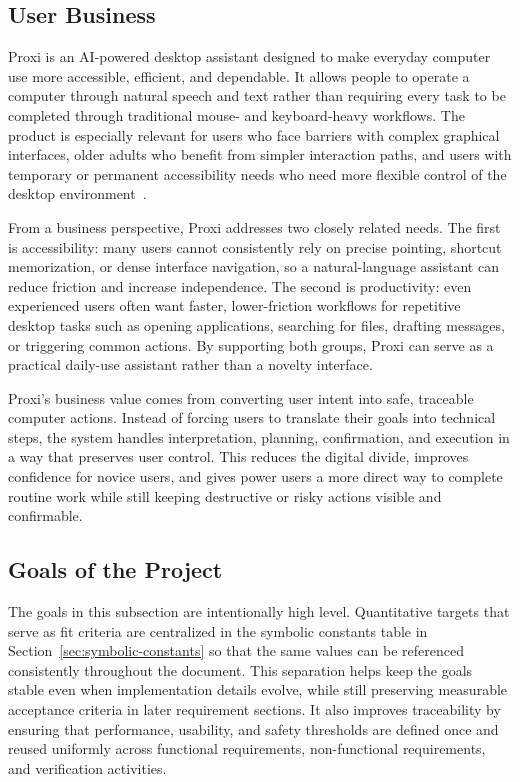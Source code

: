 \documentclass[12pt]{article}
\begin{document}
\subsection{User Business}
Proxi is an AI-powered desktop assistant designed to make everyday
computer use more accessible, efficient, and dependable. It allows
people to operate a computer through natural speech and text rather
than requiring every task to be completed through traditional mouse-
and keyboard-heavy workflows. The product is especially relevant for
users who face barriers with complex graphical interfaces, older adults
who benefit from simpler interaction paths, and users with temporary
or permanent accessibility needs who need more flexible control of the
desktop environment~\citep{WHODisability2023,W3CWCAG22}.

From a business perspective, Proxi addresses two closely related needs.
The first is accessibility: many users cannot consistently rely on
precise pointing, shortcut memorization, or dense interface navigation,
so a natural-language assistant can reduce friction and increase
independence. The second is productivity: even experienced users often
want faster, lower-friction workflows for repetitive desktop tasks such
as opening applications, searching for files, drafting messages, or
triggering common actions. By supporting both groups, Proxi can serve
as a practical daily-use assistant rather than a novelty interface.

Proxi's business value comes from converting user intent into safe,
traceable computer actions. Instead of forcing users to translate their
goals into technical steps, the system handles interpretation, planning,
confirmation, and execution in a way that preserves user control. This
reduces the digital divide, improves confidence for novice users, and
gives power users a more direct way to complete routine work while still
keeping destructive or risky actions visible and confirmable.

\subsection{Goals of the Project}
The goals in this subsection are intentionally high level. Quantitative
targets that serve as fit criteria are centralized in the symbolic
constants table in Section~\ref{sec:symbolic-constants} so that the
same values can be referenced consistently throughout the document.
This separation helps keep the goals stable even when implementation
details evolve, while still preserving measurable acceptance criteria in
later requirement sections. It also improves traceability by ensuring
that performance, usability, and safety thresholds are defined once and
reused uniformly across functional requirements, non-functional
requirements, and verification activities.
\end{document}
